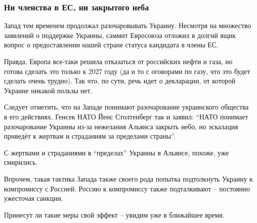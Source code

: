  
 
 
 
 

\subsubsection{Ни членства в ЕС, ни закрытого неба}
\label{sec:11_03_2022.stz.news.ua.strana.1.kiev_v_osade_itogi.6.zapad}

Запад тем временем продолжал разочаровывать Украину. Несмотря на множество
заявлений о поддержке Украины, саммит Евросоюза отложил в долгий ящик вопрос о
предоставлении нашей стране статуса кандидата в члены ЕС.

Правда, Европа все-таки решила отказаться от российских нефти и газа, но готова
сделать это только к 2027 году (да и то с оговорами по газу, что это будет
сделать очень трудно). Так что, по сути, речь идет о декларации, от которой
Украине никакой пользы нет.

Следует отметить, что на Западе понимают разочарование украинского общества в
его действиях. Генсек НАТО Йенс Столтенберг так и заявил: \enquote{НАТО понимает
разочарование Украины из-за нежелания Альянса закрыть небо, но эскалация
приведёт к жертвам и страданиям за пределами страны}.

С жертвами и страданиями в \enquote{пределах} Украины в Альянсе, похоже, уже смирились.

Впрочем, такая тактика Запада также своего рода попытка подтолкнуть Украину к
компромиссу с Россией. Россию к компромиссу также подталкивают – постоянно
ужесточая санкции.

Принесут ли такие меры свой эффект – увидим уже в ближайшее время.

